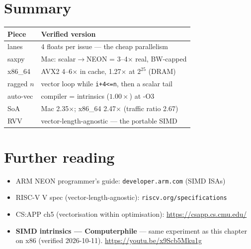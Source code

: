\section{Summary}
\begin{tabularx}{\linewidth}{@{}l X@{}}
\toprule
\textbf{Piece} & \textbf{Verified version} \\
\midrule
lanes    & 4 floats per issue --- the cheap parallelism \\
saxpy    & Mac: scalar$\to$NEON = 3--4$\times$ real, BW-capped \\
x86\_64  & AVX2 4--6$\times$ in cache, 1.27$\times$ at $2^{25}$ (DRAM) \\
ragged $n$ & vector loop while \texttt{i+4<=n}, then a scalar tail \\
auto-vec & compiler = intrinsics ($1.00\times$) at -O3 \\
SoA      & Mac 2.35$\times$; x86\_64 2.47$\times$ (traffic ratio 2.67) \\
RVV      & vector-length-agnostic --- the portable SIMD \\
\bottomrule
\end{tabularx}

\section*{Further reading}
\begin{itemize}
\item ARM NEON programmer's guide: \texttt{developer.arm.com} (SIMD ISAs)
\item RISC-V V spec (vector-length-agnostic): \texttt{riscv.org/specifications}
\item CS:APP ch5 (vectorisation within optimisation):
      \url{https://csapp.cs.cmu.edu/}
\end{itemize}

\begin{rulebox}
\begin{itemize}
\item \textbf{SIMD intrinsics --- Computerphile} --- same
      experiment as this chapter on x86 (verified 2026-10-11).
      \url{https://youtu.be/x9Scb5Mku1g}
\end{itemize}
\end{rulebox}

